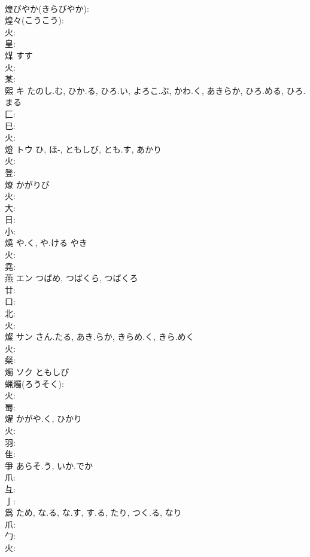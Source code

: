 \documentclass[8pt]{extreport}
\begin{document}
\begin{CJK}{UTF8}{min}
\\	煌びやか(きらびやか): 
\\	煌々(こうこう): 
\\	火: 
\\	皇: 
\\	煤		すす			
\\	火: 
\\	某: 
\\	熙	キ	たのし.む, ひか.る, ひろ.い, よろこ.ぶ, かわ.く, あきらか, ひろ.める, ひろ.まる		
\\	匚: 
\\	巳: 
\\	火: 
\\	燈	トウ	ひ, ほ-, ともしび, とも.す, あかり		
\\	火: 
\\	登: 
\\	燎		かがりび			
\\	火: 
\\	大: 
\\	日: 
\\	小: 
\\	燒		や.く, や.ける	やき			
\\	火: 
\\	堯: 
\\	燕	エン	つばめ, つばくら, つばくろ		
\\	廿: 
\\	口: 
\\	北: 
\\	火: 
\\	燦	サン	さん.たる, あき.らか, きらめ.く, きら.めく		
\\	火: 
\\	粲: 
\\	燭	ソク	ともしび		
\\	蝋燭(ろうそく): 
\\	火: 
\\	蜀: 
\\	燿		かがや.く, ひかり			
\\	火: 
\\	羽: 
\\	隹: 
\\	爭		あらそ.う, いか.でか				
\\	爪: 
\\	彑: 
\\	亅: 
\\	爲		ため, な.る, な.す, す.る, たり, つく.る, なり				
\\	爪: 
\\	勹: 
\\	火: 

\end{CJK}
\end{document}
